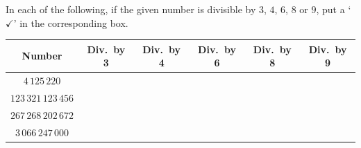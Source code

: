  In each of the following, if the given number is divisible by $3$, $4$, $6$, $8$ or $9$, put a `$\checkmark$' in the corresponding box.
\par\finishquestion

\begin{center}
\small
\begin{tabular}{|c|c|c|c|c|c|}
\hline
\textbf{Number} & \textbf{Div.\ by 3} & \textbf{Div.\ by 4} & \textbf{Div.\ by 6} & \textbf{Div.\ by 8} & \textbf{Div.\ by 9}\\
\hline
$4\,125\,220$ & & & & & \\ \hline
$123\,321\,123\,456$ & & & & & \\ \hline
$267\,268\,202\,672$ & & & & & \\ \hline
$3\,066\,247\,000$ & & & & & \\ \hline
\end{tabular}
\end{center}
